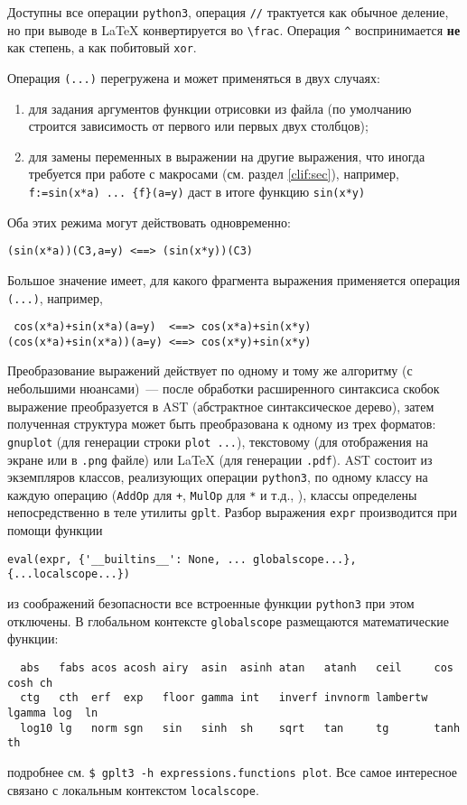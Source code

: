 \documentclass[12pt]{article}
\def\gplt{{\tt gplt}}
\def\gnuplot{{\tt gnuplot}}
\def\python{{\tt python3}}
\def\png{{\tt .png}}
\def\pdf{{\tt .pdf}}
\begin{document}
Доступны все операции \python{}, операция \verb'//' трактуется как обычное деление, но при выводе в \LaTeX{} конвертируется во \verb'\frac'.
Операция \verb'^' воспринимается {\bf не} как степень, а как побитовый \verb'xor'.

Операция \verb'(...)' перегружена и может применяться в двух случаях:
\begin{enumerate}
\item для задания аргументов функции отрисовки из файла (по умолчанию строится зависимость от первого или первых двух столбцов);
\item для замены переменных в выражении на другие выражения, что иногда требуется при работе с макросами (см. раздел \ref{clif:sec}),
  например, \verb'f:=sin(x*a) ... {f}(a=y)' даст в итоге функцию \verb'sin(x*y)'
\end{enumerate}
Оба этих режима могут действовать одновременно:
\begin{verbatim}
(sin(x*a))(C3,a=y) <==> (sin(x*y))(C3)
\end{verbatim}
Большое значение имеет, для какого фрагмента выражения применяется операция \verb'(...)', например,
\begin{verbatim}
 cos(x*a)+sin(x*a)(a=y)  <==> cos(x*a)+sin(x*y)
(cos(x*a)+sin(x*a))(a=y) <==> cos(x*y)+sin(x*y)
\end{verbatim}

Преобразование выражений действует по одному и тому же алгоритму (с небольшими нюансами)~--- после обработки расширенного синтаксиса скобок выражение преобразуется в AST
(абстрактное синтаксическое дерево), затем полученная структура может быть преобразована к одному из трех форматов: \gnuplot{} (для генерации
строки \verb'plot ...'), текстовому (для отображения на экране или в \png{} файле) или \LaTeX{} (для генерации \pdf).
AST состоит из экземпляров классов, реализующих операции \python, по одному классу на каждую операцию (\verb'AddOp' для \verb'+', \verb'MulOp' для \verb'*'
и т.д., \cite{aiv:symbalg:MM2015}),
классы определены непосредственно в теле утилиты \gplt. Разбор выражения \verb'expr' производится при помощи функции
\begin{verbatim}
eval(expr, {'__builtins__': None, ... globalscope...}, {...localscope...})
\end{verbatim}
из соображений безопасности все встроенные функции \python{} при этом отключены. В глобальном контексте \verb'globalscope' размещаются математические функции:
\begin{verbatim}
  abs   fabs acos acosh airy  asin  asinh atan   atanh   ceil     cos    cosh ch   
  ctg   cth  erf  exp   floor gamma int   inverf invnorm lambertw lgamma log  ln
  log10 lg   norm sgn   sin   sinh  sh    sqrt   tan     tg       tanh   th 
\end{verbatim}
подробнее см. \verb'$ gplt3 -h expressions.functions plot'. Все самое интересное связано с локальным контекстом \verb'localscope'.
\end{document}
